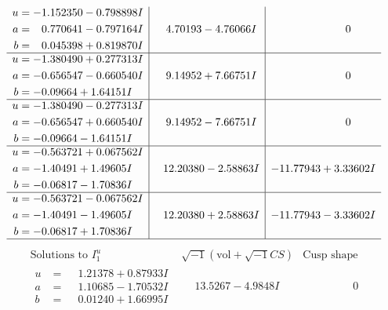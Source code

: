 \documentclass[1p]{elsarticle_modified}
\theoremstyle{definition}
\newcommand{\I}{\sqrt{-1}}
\begin{document}
$$\begin{array}{c|c|c}
\begin{aligned}
u &= -1.152350 - 0.798898 I \\
a &= \phantom{-}0.770641 - 0.797164 I \\
b &= \phantom{-}0.045398 + 0.819870 I\end{aligned}
 & \phantom{-}4.70193 - 4.76066 I & \phantom{-0.000000 } 0 \\ \hline\begin{aligned}
u &= -1.380490 + 0.277313 I \\
a &= -0.656547 - 0.660540 I \\
b &= -0.09664 + 1.64151 I\end{aligned}
 & \phantom{-}9.14952 + 7.66751 I & \phantom{-0.000000 } 0 \\ \hline\begin{aligned}
u &= -1.380490 - 0.277313 I \\
a &= -0.656547 + 0.660540 I \\
b &= -0.09664 - 1.64151 I\end{aligned}
 & \phantom{-}9.14952 - 7.66751 I & \phantom{-0.000000 } 0 \\ \hline\begin{aligned}
u &= -0.563721 + 0.067562 I \\
a &= -1.40491 + 1.49605 I \\
b &= -0.06817 - 1.70836 I\end{aligned}
 & \phantom{-}12.20380 - 2.58863 I & -11.77943 + 3.33602 I \\ \hline\begin{aligned}
u &= -0.563721 - 0.067562 I \\
a &= -1.40491 - 1.49605 I \\
b &= -0.06817 + 1.70836 I\end{aligned}
 & \phantom{-}12.20380 + 2.58863 I & -11.77943 - 3.33602 I\\
 \hline 
 \end{array}$$\newpage$$\begin{array}{c|c|c}  
\text{Solutions to }I^u_{1}& \I (\text{vol} + \sqrt{-1}CS) & \text{Cusp shape}\\
 \hline 
\begin{aligned}
u &= \phantom{-}1.21378 + 0.87933 I \\
a &= \phantom{-}1.10685 - 1.70532 I \\
b &= \phantom{-}0.01240 + 1.66995 I\end{aligned}
 & \phantom{-}13.5267 - 4.9848 I & \phantom{-0.000000 } 0 \\ \hline\begin{aligned}

\end{aligned}
\end{array}$$
\end{document}

